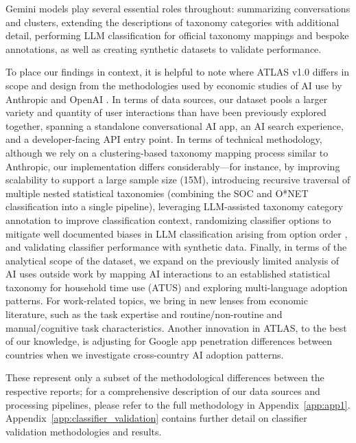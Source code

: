 \documentclass[11pt,a4paper]{article}
\begin{document}
Gemini models play several essential roles throughout: summarizing conversations and clusters, extending the descriptions of taxonomy categories with additional detail, performing LLM classification for official taxonomy mappings and bespoke annotations, as well as creating synthetic datasets to validate performance.

To place our findings in context, it is helpful to note where ATLAS v1.0 differs in scope and design from the methodologies used by economic studies of AI use by Anthropic \citep{handa2025economictasksperformedai, anthropic2026aeiv6} and OpenAI \citep[e.g.,][]{NBERw34255}. In terms of data sources, our dataset pools a larger variety and quantity of user interactions than have been previously explored together, spanning a standalone conversational AI app, an AI search experience, and a developer-facing API entry point. In terms of technical methodology, although we rely on a clustering-based taxonomy mapping process similar to Anthropic, our implementation differs considerably---for instance, by improving scalability to support a large sample size (15M), introducing recursive traversal of multiple nested statistical taxonomies (combining the SOC and O*NET classification into a single pipeline), leveraging LLM-assisted taxonomy category annotation to improve classification context, randomizing classifier options to mitigate well documented biases in LLM classification arising from option order \citep[e.g.,][]{https://doi.org/10.48550/arxiv.2308.11483}, and validating classifier performance with synthetic data. Finally, in terms of the analytical scope of the dataset, we expand on the previously limited analysis of AI uses outside work by mapping AI interactions to an established statistical taxonomy for household time use (ATUS) and exploring multi-language adoption patterns. For work-related topics, we bring in new lenses from economic literature, such as the \citet{NBERw33941} task expertise and routine/non-routine and manual/cognitive task characteristics. Another innovation in ATLAS, to the best of our knowledge, is adjusting for Google app penetration differences between countries when we investigate cross-country AI adoption patterns.

These represent only a subset of the methodological differences between the respective reports; for a comprehensive description of our data sources and processing pipelines, please refer to the full methodology in Appendix~\ref{app:app1}. Appendix~\ref{app:classifier_validation} contains further detail on classifier validation methodologies and results.
\end{document}
